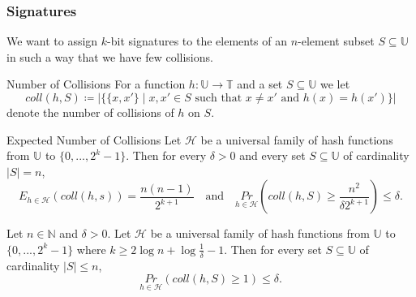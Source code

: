 \documentclass[english]{panikzettel}
\begin{document}
%


\subsubsection{Signatures}
	We want to assign $k$-bit signatures to the elements of an $n$-element subset $S\subseteq \mathbb{U}$ in such a way that we have few collisions.

	\begin{defi}{Number of Collisions}
	For a function $h:\mathbb{U}\to\mathbb{T}$ and a set $S\subseteq \mathbb{U}$ we let
	$$
	coll(h,S)\coloneqq |\{\{x,x'\}\mid x,x'\in S \text{ such that } x\neq x' \text{ and } h(x)=h(x') \}|
	$$
	denote the number of collisions of $h$ on $S$.
	\end{defi}


	\begin{theo}{Expected Number of Collisions}
	Let $\mathcal{H}$ be a universal family of hash functions from $\mathbb{U}$ to $\{0,...,2^k-1 \}$.
	Then for every $\delta>0$ and every set $S\subseteq \mathbb{U}$ of cardinality $|S|=n$,
	\[
	E_{h\in\mathcal{H}}(coll(h,s))=\frac{n(n-1)}{2^{k+1}}
	\quad\text{and}\quad
	\underset{h\in\mathcal{H}}{Pr}\left( coll(h,S) \geq \frac{n^2}{\delta 2^{k+1}} \right)\leq \delta.
	\]
	\end{theo}


	\begin{theo}{}
	Let $n\in\mathbb{N}$ and $\delta>0$. Let $\mathcal{H}$ be a universal family of hash functions from $\mathbb{U}$ to $\{0,...,2^{k}-1\}$ where $k\geq 2\log n + \log \frac{1}{\delta} -1$.
	Then for every set $S\subseteq \mathbb{U}$ of cardinality $|S| \leq n$,
	\[
	\underset{h\in\mathcal{H}}{Pr}(coll(h,S)\geq 1)\leq \delta.
	\]
	\end{theo}
\end{document}
